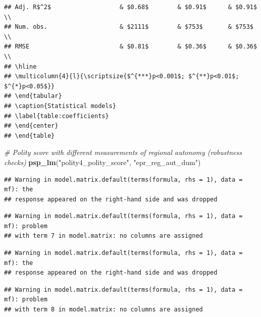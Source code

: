 \documentclass[
]{article}
\newenvironment{Shaded}{\begin{snugshade}}{\end{snugshade}}
\newcommand{\CommentTok}[1]{\textcolor[rgb]{0.56,0.35,0.01}{\textit{#1}}}
\newcommand{\KeywordTok}[1]{\textcolor[rgb]{0.13,0.29,0.53}{\textbf{#1}}}
\newcommand{\NormalTok}[1]{#1}
\newcommand{\StringTok}[1]{\textcolor[rgb]{0.31,0.60,0.02}{#1}}
\begin{document}
\begin{verbatim}
## Adj. R$^2$                   & $0.68$        & $0.91$      & $0.91$       \\
## Num. obs.                    & $2111$        & $753$       & $753$        \\
## RMSE                         & $0.81$        & $0.36$      & $0.36$       \\
## \hline
## \multicolumn{4}{l}{\scriptsize{$^{***}p<0.001$; $^{**}p<0.01$; $^{*}p<0.05$}}
## \end{tabular}
## \caption{Statistical models}
## \label{table:coefficients}
## \end{center}
## \end{table}
\end{verbatim}

\begin{Shaded}
\begin{Highlighting}[]
\CommentTok{# Polity score with different measurements of regional autonomy (robustness checks)}
\KeywordTok{psp_lm}\NormalTok{(}\StringTok{"polity4_polity_score"}\NormalTok{, }\StringTok{"epr_reg_aut_dum"}\NormalTok{)}
\end{Highlighting}
\end{Shaded}

\begin{verbatim}
## Warning in model.matrix.default(terms(formula, rhs = 1), data = mf): the
## response appeared on the right-hand side and was dropped
\end{verbatim}

\begin{verbatim}
## Warning in model.matrix.default(terms(formula, rhs = 1), data = mf): problem
## with term 7 in model.matrix: no columns are assigned
\end{verbatim}

\begin{verbatim}
## Warning in model.matrix.default(terms(formula, rhs = 1), data = mf): the
## response appeared on the right-hand side and was dropped
\end{verbatim}

\begin{verbatim}
## Warning in model.matrix.default(terms(formula, rhs = 1), data = mf): problem
## with term 8 in model.matrix: no columns are assigned
\end{verbatim}
\end{document}
